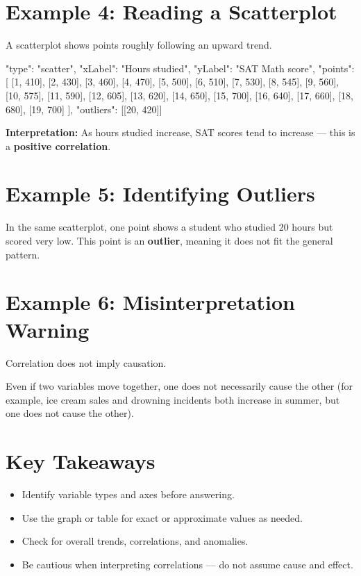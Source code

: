 \documentclass[14pt]{extarticle}
\begin{document}
\section*{Example 4: Reading a Scatterplot}

A scatterplot shows points roughly following an upward trend.

\begin{diagramdata}
{
  "type": "scatter",
  "xLabel": "Hours studied",
  "yLabel": "SAT Math score",
  "points": [
    [1, 410], [2, 430], [3, 460], [4, 470], [5, 500], [6, 510], [7, 530],
    [8, 545], [9, 560], [10, 575], [11, 590], [12, 605], [13, 620],
    [14, 650], [15, 700], [16, 640], [17, 660], [18, 680], [19, 700]
  ],
  "outliers": [[20, 420]]
}
\end{diagramdata}

\textbf{Interpretation:} As hours studied increase, SAT scores tend to increase — this is a \textbf{positive correlation}.

\section*{Example 5: Identifying Outliers}

In the same scatterplot, one point shows a student who studied 20 hours but scored very low.
This point is an \textbf{outlier}, meaning it does not fit the general pattern.

\section*{Example 6: Misinterpretation Warning}

Correlation does not imply causation.


Even if two variables move together, one does not necessarily cause the other (for example, ice cream sales and drowning incidents both increase in summer, but one does not cause the other).

\section*{Key Takeaways}
\begin{itemize}
  \item Identify variable types and axes before answering.
  \item Use the graph or table for exact or approximate values as needed.
  \item Check for overall trends, correlations, and anomalies.
  \item Be cautious when interpreting correlations — do not assume cause and effect.
\end{itemize}
\end{document}
